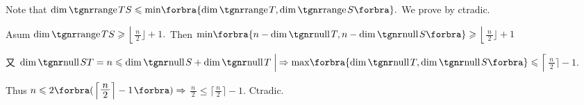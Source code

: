 \par\quad
Note that $\dim\range TS\leqslant\min\!\BigBra{\!\dim\range T,\dim\range S}.$ We prove by ctradic.\par\vspace{2pt}\quad
Asum $\dim\range TS\geqslant \Big\lfloor${\Large$\frac{\,n\,}{2}$}$\Big\rfloor+1.$ \,Then $\min\!\BigBra{n-\dim\null T,n-\dim\null S}\envFontDefault\geqslant \Big\lfloor${\Large$\frac{\,n\,}{2}$}$\Big\rfloor+1$\vspace{3pt}\par\quad
又 $\dim\null ST=n\leqslant\dim\null S+\dim\null T\;\Big|\hspace{-0.7pt}\Rightarrow\max\!\BigBra{\!\dim\null T,\dim\null S}\envFontDefault\leqslant \Big\lceil${\Large$\frac{\,n\,}{2}$}$\Big\rceil-1.$\par\vspace{3pt}\quad
Thus \;$n\leqslant 2\BigBigPar{\Big\lceil${\Large$\frac{\,n\,}{2}$}$\Big\rceil-1}\Rightarrow{}${\Large$\frac{\,n\,}{2}$}${}\leqslant\Big\lceil${\Large$\frac{\,n\,}{2}$}$\Big\rceil-1$. \;Ctradic.\PfEnd\vspace{8pt}\quad
